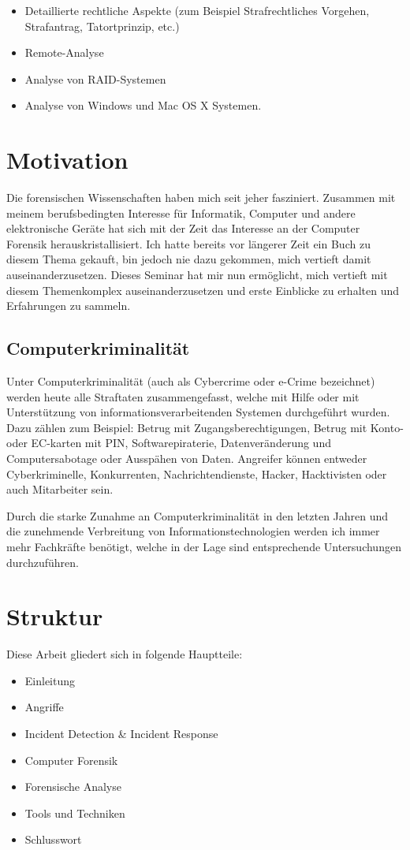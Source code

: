 \begin{itemize}
\item Detaillierte rechtliche Aspekte (zum Beispiel Strafrechtliches Vorgehen, Strafantrag, Tatortprinzip, etc.)
\item Remote-Analyse
\item Analyse von RAID-Systemen
\item Analyse von Windows und Mac OS X Systemen.
\end{itemize}

\section{Motivation}
Die forensischen Wissenschaften haben mich seit jeher fasziniert. Zusammen mit meinem berufsbedingten Interesse für Informatik, Computer und andere elektronische Geräte hat sich mit der Zeit das Interesse an der Computer Forensik herauskristallisiert. Ich hatte bereits vor längerer Zeit ein Buch zu diesem Thema gekauft, bin jedoch nie dazu gekommen, mich vertieft damit auseinanderzusetzen. Dieses Seminar hat mir nun ermöglicht, mich vertieft mit diesem Themenkomplex auseinanderzusetzen und erste Einblicke zu erhalten und Erfahrungen zu sammeln.

\subsection{Computerkriminalität}
Unter Computerkriminalität (auch als Cybercrime oder e-Crime bezeichnet) werden heute alle Straftaten zusammengefasst, welche mit Hilfe oder mit Unterstützung von informationsverarbeitenden Systemen durchgeführt wurden. Dazu zählen zum Beispiel: Betrug mit Zugangsberechtigungen, Betrug mit Konto- oder EC-karten mit PIN, Softwarepiraterie, Datenveränderung und Computersabotage oder Ausspähen von Daten. Angreifer können entweder Cyberkriminelle, Konkurrenten, Nachrichtendienste, Hacker, Hacktivisten oder auch Mitarbeiter sein.

Durch die starke Zunahme an Computerkriminalität in den letzten Jahren und die zunehmende Verbreitung von Informationstechnologien werden ich immer mehr Fachkräfte benötigt, welche in der Lage sind entsprechende Untersuchungen durchzuführen.

\section{Struktur}
Diese Arbeit gliedert sich in folgende Hauptteile:
\begin{itemize}
\item Einleitung
\item Angriffe
\item Incident Detection \& Incident Response
\item Computer Forensik
\item Forensische Analyse
\item Tools und Techniken
\item Schlusswort
\end{itemize}

